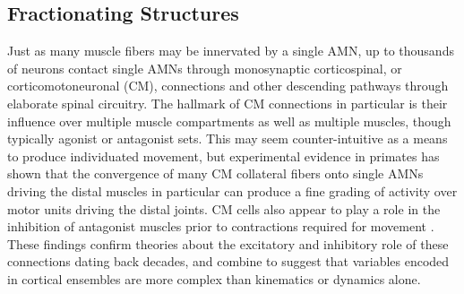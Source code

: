 \documentclass[../main.tex]{subfiles}
\begin{document}








\subsection{Fractionating Structures}\label{fractionating-structures}

Just as many muscle fibers may be innervated by a single AMN, up to thousands of neurons contact single AMNs through monosynaptic corticospinal, or corticomotoneuronal (CM), connections and other descending pathways through elaborate spinal circuitry. The hallmark of CM connections in particular is their influence over multiple muscle compartments as well as multiple muscles, though typically agonist or antagonist sets\cite{cheneyFunctionalClassesPrimate1980}. This may seem counter-intuitive as a means to produce individuated movement, but experimental evidence in primates has shown that the convergence of many CM collateral fibers onto single AMNs driving the distal muscles in particular can produce a fine grading of activity over motor units driving the distal joints. CM cells also appear to play a role in the inhibition of antagonist muscles prior to contractions required for movement \cite{griffinMotorCortexUses2020}. These findings confirm theories about the excitatory and inhibitory role of these connections dating back decades, and combine to suggest that variables encoded in cortical ensembles are more complex than kinematics or dynamics alone\cite{cheneyFunctionalClassesPrimate1980}.
\end{document}
